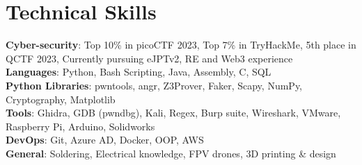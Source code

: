 \section{Technical Skills}

\begin{itemize}[leftmargin=0.15in, label={}]
    \small{\item{
        \textbf{Cyber-security}{: Top 10\% in picoCTF 2023, Top 7\% in TryHackMe, 5th place in QCTF 2023, Currently pursuing eJPTv2, RE and Web3 experience} \\ \vspace{2mm}
        \textbf{Languages}{: Python, Bash Scripting, Java, Assembly, C, SQL} \\ \vspace{2mm}
        \textbf{Python Libraries}{: pwntools, angr, Z3Prover, Faker, Scapy, NumPy, Cryptography, Matplotlib} \\ \vspace{2mm}
        \textbf{Tools}{: Ghidra, GDB (pwndbg), Kali, Regex, Burp suite, Wireshark, VMware, Raspberry Pi, Arduino, Solidworks} \\ \vspace{2mm}
        \textbf{DevOps}{: Git, Azure AD, Docker, OOP, AWS}\\ \vspace{2mm}
        \textbf{General}{: Soldering, Electrical knowledge, FPV drones, 3D printing \& design}\\
    }}
\end{itemize}
